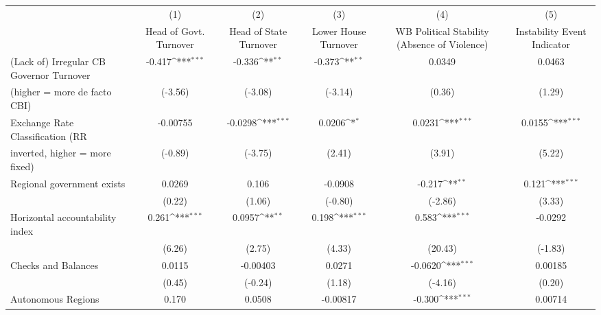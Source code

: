 {
\def\sym#1{\ifmmode^{#1}\else\(^{#1}\)\fi}
\begin{tabular}{l*{5}{c}}
\toprule
                                        &\multicolumn{1}{c}{(1)}&\multicolumn{1}{c}{(2)}&\multicolumn{1}{c}{(3)}&\multicolumn{1}{c}{(4)}&\multicolumn{1}{c}{(5)}\\
                                        &\multicolumn{1}{c}{Head of Govt. Turnover}&\multicolumn{1}{c}{Head of State Turnover}&\multicolumn{1}{c}{Lower House Turnover}&\multicolumn{1}{c}{WB Political Stability (Absence of Violence)}&\multicolumn{1}{c}{Instability Event Indicator}\\
\midrule
(Lack of) Irregular CB Governor Turnover&   -0.417\sym{***}&   -0.336\sym{**} &   -0.373\sym{**} &   0.0349         &   0.0463         \\
(higher = more de facto CBI)            &  (-3.56)         &  (-3.08)         &  (-3.14)         &   (0.36)         &   (1.29)         \\
\addlinespace
Exchange Rate Classification (RR        & -0.00755         &  -0.0298\sym{***}&   0.0206\sym{*}  &   0.0231\sym{***}&   0.0155\sym{***}\\
inverted, higher = more fixed)          &  (-0.89)         &  (-3.75)         &   (2.41)         &   (3.91)         &   (5.22)         \\
\addlinespace
Regional government exists              &   0.0269         &    0.106         &  -0.0908         &   -0.217\sym{**} &    0.121\sym{***}\\
                                        &   (0.22)         &   (1.06)         &  (-0.80)         &  (-2.86)         &   (3.33)         \\
\addlinespace
Horizontal accountability index         &    0.261\sym{***}&   0.0957\sym{**} &    0.198\sym{***}&    0.583\sym{***}&  -0.0292         \\
                                        &   (6.26)         &   (2.75)         &   (4.33)         &  (20.43)         &  (-1.83)         \\
\addlinespace
Checks and Balances                     &   0.0115         & -0.00403         &   0.0271         &  -0.0620\sym{***}&  0.00185         \\
                                        &   (0.45)         &  (-0.24)         &   (1.18)         &  (-4.16)         &   (0.20)         \\
\addlinespace
Autonomous Regions                      &    0.170         &   0.0508         & -0.00817         &   -0.300\sym{***}&  0.00714         \\

\end{tabular}}
